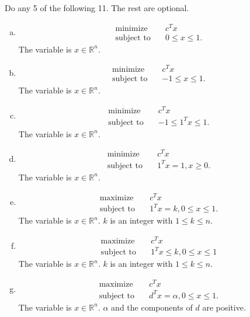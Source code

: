 \documentclass{article}
\begin{document}
Do any 5 of the following 11. The rest are optional.

\begin{enumerate}[(a)]
\item 
\begin{align*}
\text{minimize} \quad & c^T x \\
\text{subject to} \quad & 0 \leq x \leq 1.
\end{align*}
The variable is $x \in \mathbb{R}^n$.

\item 
\begin{align*}
\text{minimize} \quad & c^T x \\
\text{subject to} \quad & -1 \leq x \leq 1.
\end{align*}
The variable is $x \in \mathbb{R}^n$.

\item 
\begin{align*}
\text{minimize} \quad & c^T x \\
\text{subject to} \quad & -1 \leq 1^T x \leq 1.
\end{align*}
The variable is $x \in \mathbb{R}^n$.

\item 
\begin{align*}
\text{minimize} \quad & c^T x \\
\text{subject to} \quad & 1^T x = 1, x \geq 0.
\end{align*}
The variable is $x \in \mathbb{R}^n$.

\item 
\begin{align*}
\text{maximize} \quad & c^T x \\
\text{subject to} \quad & 1^T x = k, 0 \leq x \leq 1.
\end{align*}
The variable is $x \in \mathbb{R}^n$. $k$ is an integer with $1 \leq k \leq n$.

\item 
\begin{align*}
\text{maximize} \quad & c^T x \\
\text{subject to} \quad & 1^T x \leq k, 0 \leq x \leq 1
\end{align*}
The variable is $x \in \mathbb{R}^n$. $k$ is an integer with $1 \leq k \leq n$.

\item 
\begin{align*}
\text{maximize} \quad & c^T x \\
\text{subject to} \quad & d^T x = \alpha, 0 \leq x \leq 1.
\end{align*}
The variable is $x \in \mathbb{R}^n$. $\alpha$ and the components of $d$ are positive.


\end{enumerate}
\end{document}
